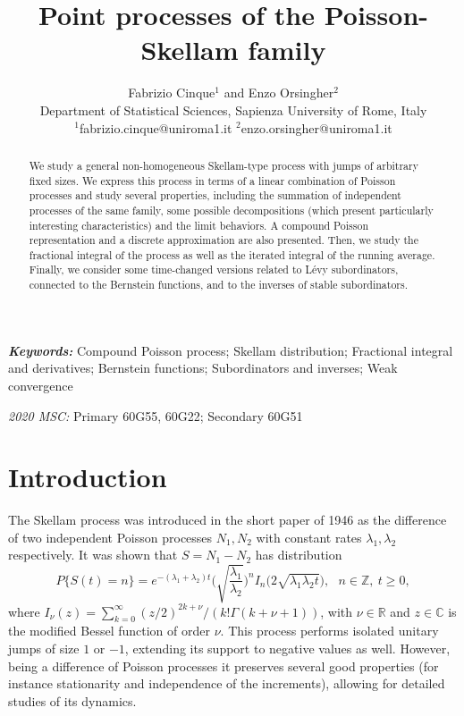 \documentclass[12pt, twoside, english, headsepline]{article}
\title{Point processes of the Poisson-Skellam family}
\author{Fabrizio Cinque$^1$ and Enzo Orsingher$^2$\\
        \small Department of Statistical Sciences, Sapienza University of Rome, Italy \\
        \small $^1$fabrizio.cinque@uniroma1.it $^2$enzo.orsingher@uniroma1.it
}
\theoremstyle{definition} %
\numberwithin{equation}{section} %
\providecommand{\keywords}[1]
{
  \small	
  \textbf{\textit{Keywords: }} #1
}
\providecommand{\MSC}[1]
{
  \small	
  \textit{2020 MSC: } #1   
}
\begin{document}
\maketitle

\begin{abstract}
We study a general non-homogeneous Skellam-type process with jumps of arbitrary fixed sizes. We express this process in terms of a linear combination of Poisson processes and study several properties, including the summation of independent processes of the same family, some possible decompositions (which present particularly interesting characteristics) and the limit behaviors. A compound Poisson representation and a discrete approximation are also presented. Then, we study the fractional integral of the process as well as the iterated integral of the running average. Finally, we consider some time-changed versions related to L\'{e}vy subordinators, connected to the Bernstein functions, and to the inverses of stable subordinators.
\end{abstract} \hspace{10pt}

\keywords{Compound Poisson process; Skellam distribution; Fractional integral and derivatives; Bernstein functions; Subordinators and inverses; Weak convergence}

\MSC{Primary 60G55, 60G22; Secondary 60G51}



\section{Introduction}

The Skellam process was introduced in the short paper \cite{S1946} of 1946 as the difference of two independent Poisson processes $N_1,N_2$ with constant rates $\lambda_1,\lambda_2$ respectively. It was shown that $S = N_1-N_2$ has distribution 
\begin{equation}\label{introduzioneLeggeSkellam}
P\{S(t) = n\} = e^{-(\lambda_1+\lambda_2)t} \Biggl(\sqrt{\frac{\lambda_1}{\lambda_2}}\Bigg)^{n} I_{n}\big(2\sqrt{\lambda_1\lambda_2t}\big),\ \ \ n\in\mathbb{Z},\ t\ge0,
\end{equation}
where $I_\nu(z) = \sum_{k=0}^\infty (z/2)^{2k+\nu}/ (k! \Gamma(k+\nu + 1))$, with $\nu\in \mathbb{R}$ and $z\in\mathbb{C}$ is the modified Bessel function of order $\nu$. This process performs isolated unitary jumps of size $1$ or $-1$, extending its support to negative values as well. However, being a difference of Poisson processes it preserves several good properties (for instance stationarity and independence of the increments), allowing for detailed studies of its dynamics.
\end{document}
